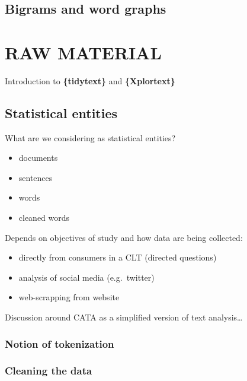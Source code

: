 \documentclass[
]{book}
\providecommand{\tightlist}{%
  \setlength{\itemsep}{0pt}\setlength{\parskip}{0pt}}
\begin{document}
\hypertarget{bigrams-and-word-graphs}{%
\subsection{Bigrams and word graphs}\label{bigrams-and-word-graphs}}

\hypertarget{raw-material-2}{%
\section{RAW MATERIAL}\label{raw-material-2}}

Introduction to \textbf{\{tidytext\}} and \textbf{\{Xplortext\}}

\hypertarget{statistical-entities}{%
\subsection{Statistical entities}\label{statistical-entities}}

What are we considering as statistical entities?

\begin{itemize}
\tightlist
\item
  documents
\item
  sentences
\item
  words
\item
  cleaned words
\end{itemize}

Depends on objectives of study and how data are being collected:

\begin{itemize}
\tightlist
\item
  directly from consumers in a CLT (directed questions)
\item
  analysis of social media (e.g.~twitter)
\item
  web-scrapping from website
\end{itemize}

Discussion around CATA as a simplified version of text analysis\ldots{}

\hypertarget{notion-of-tokenization}{%
\subsubsection{Notion of tokenization}\label{notion-of-tokenization}}

\hypertarget{cleaning-the-data}{%
\subsubsection{Cleaning the data}\label{cleaning-the-data}}
\end{document}
